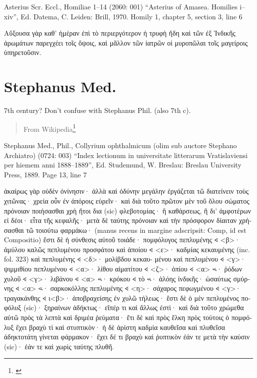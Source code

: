 \documentclass[12pt,letterpaper,twoside,final]{memoir}
\begin{document}
\begin{greek}

Asterius Scr. Eccl., Homiliae 1–14 (2060: 001)
“Asterius of Amasea. Homilies i–xiv”, Ed. Datema, C.
Leiden: Brill, 1970.
Homily 1, chapter 5, section 3, line 6

                                                                    Αὔξουσα γὰρ 
καθ' ἡμέραν ἐπὶ τὸ περιεργότερον ἡ τρυφὴ ἤδη καὶ τῶν ἐξ Ἰνδικῆς 
ἀρωμάτων παρεγχέει τοῖς ὄψοις, καὶ μᾶλλον τῶν ἰατρῶν οἱ μυροπῶλαι 
τοῖς μαγείροις ὑπηρετοῦσιν. 

\end{greek}

\section{Stephanus Med.}%
7th century? Don't confuse with Stephanus Phil. (also 7th c).

\blockquote[From Wikipedia\footnote{\url{}}]{}
\begin{greek}

Stephanus Med., Phil., Collyrium ophthalmicum (olim sub auctore Stephano Archiatro) (0724: 003)
“Index lectionum in universitate litterarum Vratislaviensi per hiemem anni 1888–1889”, Ed. Studemund, W.
Breslau: Breslau University Press, 1889.
Page 13, line 7

                                                                               ἀκαίρως γὰρ οὐδὲν ὀνίνησιν· ἀλλὰ καὶ ὀδύνην   
μεγάλην ἐργάζεται τῶ διατείνειν τοὺς χιτῶνας· χρεία οὖν ἐν ἀπόροις εὑρεῖν· καὶ διὰ τοῦτο πρῶτον μὲν τοῦ ὅλου 
σώματος πρόνοιαν ποιήσασθαι χρὴ ἤτοι δια (sic) φλεβοτομίας· ἢ καθάρσεως, ἢ δι' ἀμφοτέρων εἰ δέοι· εἶτα τῆς κεφαλῆς· 
μετὰ δὲ ταύτης πρόνοιαν καὶ τὴν πρόσφορον δίαιταν χρήσασθαι τῶ τοιούτω φαρμάκω· (manus recens in margine 
adscripsit: Comp, id est Compositio) ἔστι δὲ ἡ σύνθεσις αὐτοῦ τοιάδε· πομφόλυγος πεπλυμένης 𐅻 <β>· ἀμύλου καλῶς 
πεπλυμένου προσφάτου καὶ ἀποίου 𐅻 <ε>· καδμίας κεκαυμένης (inc. fol. 323) καὶ πεπλυμένης 𐅻 <δ>· μολίβδου κεκαυ-
μένου καὶ πεπλυμένου 𐅻 <γ>· ψιμμιθίου πεπλυμένου 𐅻 <α>· λίθου αἱματίτου 𐅻 <ζ>· ὀπίου 𐅻 <α> 𐅶· ῥόδων χυλοῦ 𐅻 <γ>· λιβάνου 
𐅻 <α> 𐅶· κρόκου 𐅻 τὸ 𐅶· ἀλόης ἰνδικῆς· ὡσαύτως σμύρνης 𐅻 <α> 𐅶· σαρκοκόλλης πεπλυμένης 𐅻 <η>· σάχαρος πεφωγμένου 
𐅻 <γ>· τραγακάνθης 𐅻 ι<β>· ἀποβραχείσης ἐν χυλῶ τήλεως· ἔστι δὲ ὁ μὲν πεπλυμένος ποφόλυξ (sic)· ξηραίνων ἀδήκτως· 
εἴπέρ τι καὶ ἄλλως ἐστὶ· καὶ διὰ τοῦτο χρώμεθα αὐτῶ πρὸς τὰ λεπτὰ καὶ δριμέα ῥεύματα· ἔτι δὲ καὶ πρὸς ἕλκη 
πρὸς τούτοις ὁ πομφόλυξ ἔχει βραχὺ τὶ καὶ στυπτικὸν· ἡ δὲ ἀρίστη καδμία καυθεῖσα καὶ πλυθεῖσα ἀδηκτοτάτη 
γίνεται φάρμακον· ἔχει δέ τι βραχὺ καὶ ῥυπτικὸν ἐάν τε μετὰ τὴν καύσιν (sic)· ἐάν τε καὶ χωρὶς ταύτης πλυθῆ. 

\end{greek}
\end{document}
